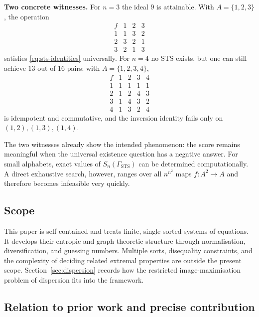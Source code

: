 \documentclass[11pt]{article}
\theoremstyle{plain}
\theoremstyle{definition}
\theoremstyle{definition}
\theoremstyle{remark}
\newcommand{\A}{A}
\newcommand{\Sn}{S_n}
\begin{document}
\medskip
\noindent\textbf{Two concrete witnesses.}
For $n=3$ the ideal $9$ is attainable. With $\A=\{1,2,3\}$, the operation
\[
\begin{array}{c|ccc}
 f & 1 & 2 & 3\\\hline
 1 & 1 & 3 & 2\\
 2 & 3 & 2 & 1\\
 3 & 2 & 1 & 3
\end{array}
\]
satisfies \eqref{eq:sts-identities} universally.
For $n=4$ no STS exists, but one can still achieve $13$ out of $16$ pairs: with $\A=\{1,2,3,4\}$,
\[
\begin{array}{c|cccc}
 f & 1 & 2 & 3 & 4\\\hline
 1 & 1 & 1 & 1 & 1\\
 2 & 1 & 2 & 4 & 3\\
 3 & 1 & 4 & 3 & 2\\
 4 & 1 & 3 & 2 & 4
\end{array}
\]
is idempotent and commutative, and the inversion identity fails only on $(1,2),(1,3),(1,4)$.


The two witnesses already show the intended phenomenon: the score remains meaningful when the universal existence
question has a negative answer. For small alphabets, exact values of
$\Sn(\Gamma_{\mathrm{STS}})$ can be determined computationally. A direct exhaustive search,
however, ranges over all $n^{n^2}$ maps $f:\A^2\to\A$ and therefore becomes infeasible very
quickly.

\subsection{Scope}

This paper is self-contained and treats finite, single-sorted systems of equations. It develops
their entropic and graph-theoretic structure through normalisation, diversification, and
guessing numbers. Multiple sorts, disequality constraints, and the complexity of deciding
related extremal properties are outside the present scope. Section~\ref{sec:dispersion} records
how the restricted image-maximisation problem of dispersion fits into the framework.

\subsection{Relation to prior work and precise contribution}
\end{document}
